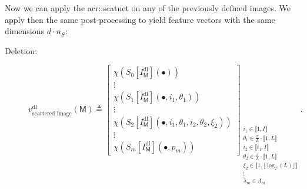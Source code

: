             Now we can apply the \gls{acr::scatnet} on any of the previously defined images.
            We apply then the same post-processing to yield feature vectors with the same dimensions \(d \cdot n_S\):

            \begin{description}
                \item[Deletion:]
                        \begin{equation}
                            \label{eq::deletion_scanetg_image_based_features}
                            v^{\text{dl}}_{\text{scattered image}}\left(\mathsf{M}\right) \triangleq \begin{bmatrix}
                                \chi \left(S_0[I^{\text{dl}}_{\mathsf{M}}]\left(\bullet\right)\right)\\
                                \vdots\\
                                \chi \left(S_1[I^{\text{dl}}_{\mathsf{M}}]\left(\bullet, i_1, \theta_1\right)\right)\\
                                \vdots\\
                                \chi \left(S_2[I^{\text{dl}}_{\mathsf{M}}]\left(\bullet, i_1, \theta_1, i_2, \theta_2, \xi_2\right)\right)\\
                                \vdots\\
                                \chi \left(S_m[I^{\text{dl}}_{\mathsf{M}}]\left(\bullet, p_m\right)\right)
                            \end{bmatrix}_{
                                \substack{
                                    i_1 \in \llbracket 1, I \rrbracket\\
                                    \theta_1 \in \frac{\pi}{L} \cdot \llbracket 1, L \rrbracket\\
                                    i_2 \in \llbracket i_1, I \rrbracket\\
                                    \theta_2 \in \frac{\pi}{L} \cdot \llbracket 1, L \rrbracket\\
                                    \xi_2 \in \llbracket 1, \lfloor\log_2(L)\rfloor \rrbracket\\
                                    \vdots\\
                                    \lambda_m \in \Lambda_m
                                }
                            }.
                        \end{equation}

\end{description}
